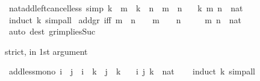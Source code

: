 \begin{isabellebody}
\endisatagproof
{\isafoldproof}%
%
\isadelimproof
\isanewline
%
\endisadelimproof
\isanewline
{}\isamarkupfalse%
\ nat{\isacharunderscore}{\kern0pt}add{\isacharunderscore}{\kern0pt}left{\isacharunderscore}{\kern0pt}cancel{\isacharunderscore}{\kern0pt}less\ {\isacharbrackleft}{\kern0pt}simp{\isacharbrackright}{\kern0pt}{\isacharcolon}{\kern0pt}\ {\isachardoublequoteopen}k\ {\isacharplus}{\kern0pt}\ m\ {\isacharless}{\kern0pt}\ k\ {\isacharplus}{\kern0pt}\ n\ {\isasymlongleftrightarrow}\ m\ {\isacharless}{\kern0pt}\ n{\isachardoublequoteclose}\isanewline
\ \ \ k\ m\ n\ {\isacharcolon}{\kern0pt}{\isacharcolon}{\kern0pt}\ nat\isanewline
%
\isadelimproof
\ \ %
\endisadelimproof
%
\isatagproof
{}\isamarkupfalse%
\ {\isacharparenleft}{\kern0pt}induct\ k{\isacharparenright}{\kern0pt}\ simp{\isacharunderscore}{\kern0pt}all%
\endisatagproof
{\isafoldproof}%
%
\isadelimproof
\isanewline
%
\endisadelimproof
\isanewline
{}\isamarkupfalse%
\ add{\isacharunderscore}{\kern0pt}gr{\isacharunderscore}{\kern0pt}{}\ {\isacharbrackleft}{\kern0pt}iff{\isacharbrackright}{\kern0pt}{\isacharcolon}{\kern0pt}\ {\isachardoublequoteopen}m\ {\isacharplus}{\kern0pt}\ n\ {\isachargreater}{\kern0pt}\ {}\ {\isasymlongleftrightarrow}\ m\ {\isachargreater}{\kern0pt}\ {}\ {\isasymor}\ n\ {\isachargreater}{\kern0pt}\ {}{\isachardoublequoteclose}\isanewline
\ \ \ m\ n\ {\isacharcolon}{\kern0pt}{\isacharcolon}{\kern0pt}\ nat\isanewline
%
\isadelimproof
\ \ %
\endisadelimproof
%
\isatagproof
{}\isamarkupfalse%
\ {\isacharparenleft}{\kern0pt}auto\ dest{\isacharcolon}{\kern0pt}\ gr{}{\isacharunderscore}{\kern0pt}implies{\isacharunderscore}{\kern0pt}Suc{\isacharparenright}{\kern0pt}%
\endisatagproof
{\isafoldproof}%
%
\isadelimproof
%
\endisadelimproof
%
\begin{isamarkuptext}%
strict, in 1st argument%
\end{isamarkuptext}\isamarkuptrue%
\isamarkupfalse%
\ add{\isacharunderscore}{\kern0pt}less{\isacharunderscore}{\kern0pt}mono{}{\isacharcolon}{\kern0pt}\ {\isachardoublequoteopen}i\ {\isacharless}{\kern0pt}\ j\ {\isasymLongrightarrow}\ i\ {\isacharplus}{\kern0pt}\ k\ {\isacharless}{\kern0pt}\ j\ {\isacharplus}{\kern0pt}\ k{\isachardoublequoteclose}\isanewline
\ \ \ i\ j\ k\ {\isacharcolon}{\kern0pt}{\isacharcolon}{\kern0pt}\ nat\isanewline
%
\isadelimproof
\ \ %
\endisadelimproof
%
\isatagproof
{}\isamarkupfalse%
\ {\isacharparenleft}{\kern0pt}induct\ k{\isacharparenright}{\kern0pt}\ simp{\isacharunderscore}{\kern0pt}all%

\end{isabellebody}
